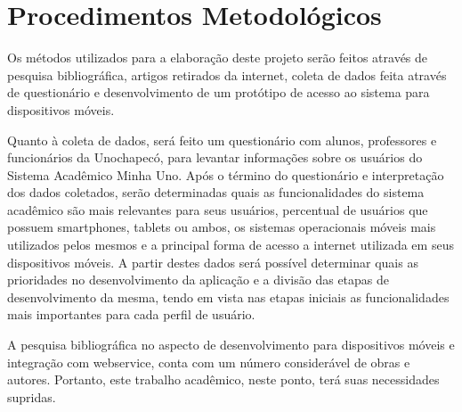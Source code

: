 \section{Procedimentos Metodológicos}

Os métodos utilizados para a elaboração deste projeto serão feitos através de pesquisa bibliográfica, artigos retirados da internet, coleta de dados feita através de questionário e desenvolvimento de um protótipo de acesso ao sistema para dispositivos móveis.

Quanto à coleta de dados, será feito um questionário com alunos, professores e funcionários da Unochapecó, para levantar informações sobre os usuários do Sistema Acadêmico Minha Uno.  Após o término do questionário e interpretação dos dados coletados, serão determinadas quais as funcionalidades do sistema acadêmico são mais relevantes para seus usuários, percentual de usuários que possuem smartphones, tablets ou ambos, os sistemas operacionais móveis mais utilizados pelos mesmos e a principal forma de acesso a internet utilizada em seus dispositivos móveis. A partir destes dados será possível determinar quais as prioridades no desenvolvimento da aplicação e a divisão das etapas de desenvolvimento da mesma, tendo em vista nas etapas iniciais as funcionalidades mais importantes para cada perfil de usuário.

A pesquisa bibliográfica no aspecto de desenvolvimento para dispositivos móveis e integração com webservice, conta com um número considerável de obras e autores. Portanto, este trabalho acadêmico, neste ponto, terá suas necessidades supridas.


